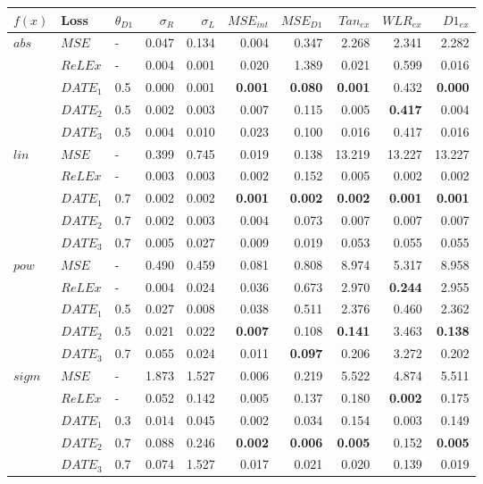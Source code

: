 \documentclass[runningheads]{llncs}
\begin{document}
\begin{table}
 \centering
 \begin{tabular}{l|l|l|rr|rr|rrr}
 $f(x)$ & Loss & $\theta_{D1}$ & $\sigma_{R}$ & $\sigma_{L}$ & 
 $MSE_{int}$ & $MSE_{D1}$ & $Tan_{ex}$ & $WLR_{ex}$ & $D1_{ex}$ \\
 \hline 
 
 \hline
 \multirow{5}{0.8cm}{$abs$} 
 
 & $MSE$ & - & 0.047 & 0.134 & 0.004 & 0.347 & 2.268 & 2.341 & 2.282 \\
 & $ReLEx$ & - & 0.004 & 0.001 & 0.020 & 1.389 & 0.021 & 0.599 & 0.016 \\
 & $DATE_1$ & 0.5 & 0.000 & 0.001 & \textbf{0.001} & \textbf{0.080} & \textbf{0.001} & 0.432 & \textbf{0.000} \\
 & $DATE_2$ & 0.5 & 0.002 & 0.003 & 0.007 & 0.115 & 0.005 & \textbf{0.417} & 0.004 \\
 & $DATE_3$ & 0.5 & 0.004 & 0.010 & 0.023 & 0.100 & 0.016 & 0.417 & 0.016 \\
 
 \hline 
 \multirow{5}{0.8cm}{$lin$} 
 & $MSE$ & - & 0.399 & 0.745 & 0.019 & 0.138 & 13.219 & 13.227 & 13.227 \\
 & $ReLEx$ & - & 0.003 & 0.003 & 0.002 & 0.152 & 0.005 & 0.002 & 0.002 \\
 & $DATE_1$ & 0.7 & 0.002 & 0.002 & \textbf{0.001} & \textbf{0.002} & \textbf{0.002} & \textbf{0.001} & \textbf{0.001} \\
 & $DATE_2$ & 0.7 & 0.002 & 0.003 & 0.004 & 0.073 & 0.007 & 0.007 & 0.007 \\
 & $DATE_3$ & 0.7 & 0.005 & 0.027 & 0.009 & 0.019 & 0.053 & 0.055 & 0.055 \\
 
 \hline 
\multirow{5}{0.8cm}{$pow$} 
 & $MSE$ & - & 0.490 & 0.459 & 0.081 & 0.808 & 8.974 & 5.317 & 8.958 \\
 & $ReLEx$ & - & 0.004 & 0.024 & 0.036 & 0.673 & 2.970 & \textbf{0.244} & 2.955 \\
 & $DATE_1$ & 0.5 & 0.027 & 0.008 & 0.038 & 0.511 & 2.376 & 0.460 & 2.362 \\
 & $DATE_2$ & 0.5 & 0.021 & 0.022 & \textbf{0.007} & 0.108 & \textbf{0.141} & 3.463 & \textbf{0.138} \\
 & $DATE_3$ & 0.7 & 0.055 & 0.024 & 0.011 &\textbf{ 0.097} & 0.206 & 3.272 & 0.202 \\
 
 \hline
 \multirow{5}{0.8cm}{$sigm$} 
 & $MSE$ & - & 1.873 & 1.527 & 0.006 & 0.219 & 5.522 & 4.874 & 5.511 \\
 & $ReLEx$ & - & 0.052 & 0.142 & 0.005 & 0.137 & 0.180 & \textbf{0.002} & 0.175 \\
 & $DATE_1$ & 0.3 & 0.014 & 0.045 & 0.002 & 0.034 & 0.154 & 0.003 & 0.149 \\
 & $DATE_2$ & 0.7 & 0.088 & 0.246 & \textbf{0.002} & \textbf{0.006} & \textbf{0.005} & 0.152 & \textbf{0.005} \\
 & $DATE_3$ & 0.7 & 0.074 & 1.527 & 0.017 & 0.021 & 0.020 & 0.139 & 0.019 \\
 

\end{tabular}
\end{table}
\end{document}
